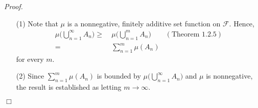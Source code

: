 \documentclass{article}
\begin{document}
\emph{Proof.}
\begin{enumerate}
\item[(1)]
  Note that $\mu$ is a nonnegative, finitely additive set function on $\mathscr{F}$.
  Hence,
  \begin{align*}
    \mu \Bigg( \bigcup_{n=1}^{\infty} A_n \Bigg)
    \geq
    & \:
      \mu \Bigg( \bigcup_{n=1}^{m} A_n \Bigg)
      & (\text{Theorem 1.2.5}) \\
    =
    & \:
      \sum_{n=1}^{m} \mu(A_n)
  \end{align*}
  for every $m$.

\item[(2)]
  Since $\sum_{n=1}^{m} \mu(A_n)$ is bounded by $\mu \big( \bigcup_{n=1}^{\infty} A_n \big)$
  and $\mu$ is nonnegative,
  the result is established as letting $m \to \infty$.
\end{enumerate}
$\Box$ \\\\



\end{document}
